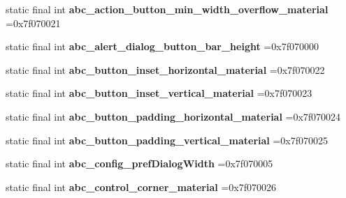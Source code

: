 \begin{DoxyCompactItemize}
\item 
\hypertarget{classcheck_1_1test_1_1_r_1_1dimen_ae3e40332ce4e8cb59fdbee66dd1e1222}{}static final int {\bfseries abc\+\_\+action\+\_\+button\+\_\+min\+\_\+width\+\_\+overflow\+\_\+material} =0x7f070021\label{classcheck_1_1test_1_1_r_1_1dimen_ae3e40332ce4e8cb59fdbee66dd1e1222}

\item 
\hypertarget{classcheck_1_1test_1_1_r_1_1dimen_a37585de49afc8ec8ec0b9d13bbdc36ce}{}static final int {\bfseries abc\+\_\+alert\+\_\+dialog\+\_\+button\+\_\+bar\+\_\+height} =0x7f070000\label{classcheck_1_1test_1_1_r_1_1dimen_a37585de49afc8ec8ec0b9d13bbdc36ce}

\item 
\hypertarget{classcheck_1_1test_1_1_r_1_1dimen_a77b213d02452707917d16e6ff3993dcf}{}static final int {\bfseries abc\+\_\+button\+\_\+inset\+\_\+horizontal\+\_\+material} =0x7f070022\label{classcheck_1_1test_1_1_r_1_1dimen_a77b213d02452707917d16e6ff3993dcf}

\item 
\hypertarget{classcheck_1_1test_1_1_r_1_1dimen_a13e48b3dc95b3e56e41c6b998e21163e}{}static final int {\bfseries abc\+\_\+button\+\_\+inset\+\_\+vertical\+\_\+material} =0x7f070023\label{classcheck_1_1test_1_1_r_1_1dimen_a13e48b3dc95b3e56e41c6b998e21163e}

\item 
\hypertarget{classcheck_1_1test_1_1_r_1_1dimen_abdbe7d437306ecf5cc359bb8874b3907}{}static final int {\bfseries abc\+\_\+button\+\_\+padding\+\_\+horizontal\+\_\+material} =0x7f070024\label{classcheck_1_1test_1_1_r_1_1dimen_abdbe7d437306ecf5cc359bb8874b3907}

\item 
\hypertarget{classcheck_1_1test_1_1_r_1_1dimen_a76717df5ded2cd3a4071cdfaf434d355}{}static final int {\bfseries abc\+\_\+button\+\_\+padding\+\_\+vertical\+\_\+material} =0x7f070025\label{classcheck_1_1test_1_1_r_1_1dimen_a76717df5ded2cd3a4071cdfaf434d355}

\item 
\hypertarget{classcheck_1_1test_1_1_r_1_1dimen_a37dbaced81fbdf18bedac9e5d77a06cd}{}static final int {\bfseries abc\+\_\+config\+\_\+pref\+Dialog\+Width} =0x7f070005\label{classcheck_1_1test_1_1_r_1_1dimen_a37dbaced81fbdf18bedac9e5d77a06cd}

\item 
\hypertarget{classcheck_1_1test_1_1_r_1_1dimen_a135f10eca160466d377394ee3993a4b8}{}static final int {\bfseries abc\+\_\+control\+\_\+corner\+\_\+material} =0x7f070026\label{classcheck_1_1test_1_1_r_1_1dimen_a135f10eca160466d377394ee3993a4b8}


\end{DoxyCompactItemize}
